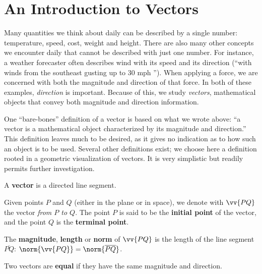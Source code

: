 \section{An Introduction to Vectors}\label{sec:vector_intro}

Many quantities we think about daily can be described by a single number: temperature, speed, cost, weight and height. There are also many other concepts we encounter daily that cannot be described with just one number. For instance, a weather forecaster often describes wind with its speed and its direction (``\dotso with winds from the southeast gusting up to 30 mph \dotso''). When applying a force, we are concerned with both the magnitude and direction of that force. In both of these examples, \emph{direction} is important. Because of this, we study \emph{vectors}, mathematical objects that convey both magnitude and direction information.\bigskip

One ``bare-bones'' definition of a vector is based on what we wrote above: ``a vector is a mathematical object characterized by its magnitude and direction.'' This definition leaves much to be desired, as it gives no indication as to how such an object is to be used. Several other definitions exist; we choose here a definition rooted in a geometric visualization of vectors. It is very simplistic but readily permits further investigation.


\begin{definition}[Vector]\label{def:vector}
A \textbf{vector} is a directed line segment.\bigskip

Given points $P$ and $Q$ (either in the plane or in space), we denote with $\vv{PQ}$ the vector \emph{from $P$ to $Q$}. The point $P$ is said to be the \textbf{initial point} of the vector, and the point $Q$ is the \textbf{terminal point}. \bigskip

The \textbf{magnitude}, \textbf{length} or \textbf{norm} of $\vv{PQ}$ is the length of the line segment $\overline{PQ}$: $\norm{\vv{PQ}} = \norm{\overline{PQ}}$.\bigskip

Two vectors are \textbf{equal} if they have the same magnitude and direction.
\end{definition}


